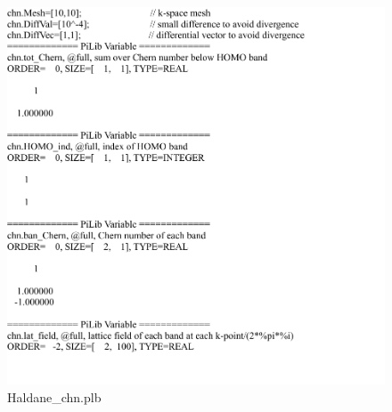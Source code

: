 \documentclass[10pt,a4paper]{article}
\begin{document}
\begin{figure}[tbp]
\centering
\includegraphics[width=0.9\columnwidth]{Haldane_chn.pdf}
\caption{Haldane\_chn.plb}
\end{figure}
\end{document}
